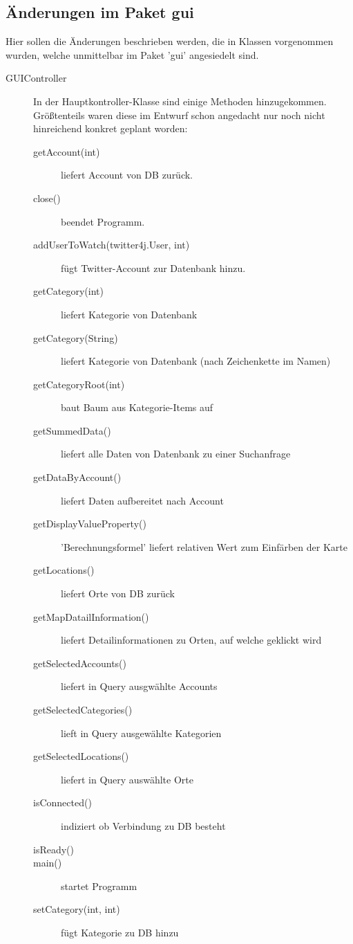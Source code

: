 \subsection{Änderungen im Paket gui}
	Hier sollen die Änderungen beschrieben werden, die in Klassen vorgenommen wurden, welche unmittelbar im Paket 'gui' angesiedelt sind.
	\begin{description}
		\item [GUIController] 
		\quad 
		In der Hauptkontroller-Klasse sind einige Methoden hinzugekommen. Größtenteils waren diese im Entwurf schon angedacht nur noch nicht hinreichend konkret geplant worden:
		\begin{description}
			\item[getAccount(int)] liefert Account von DB zurück.
			\item[close()] beendet Programm.
			\item[addUserToWatch(twitter4j.User, int)] fügt Twitter-Account zur Datenbank hinzu.
			\item[getCategory(int)] liefert Kategorie von Datenbank
			\item[getCategory(String)] liefert Kategorie von Datenbank (nach Zeichenkette im Namen)
			\item[getCategoryRoot(int\text{[]})] baut Baum aus Kategorie-Items auf
			\item[getSummedData()] liefert alle Daten von Datenbank zu einer Suchanfrage
			\item[getDataByAccount()] liefert Daten aufbereitet nach Account
			\item[getDisplayValueProperty()] 'Berechnungsformel' liefert relativen Wert zum Einfärben der Karte
			\item[getLocations()] liefert Orte von DB zurück
			\item[getMapDatailInformation()] liefert Detailinformationen zu Orten, auf welche geklickt wird
			\item[getSelectedAccounts()] liefert in Query ausgwählte Accounts
			\item[getSelectedCategories()] lieft in Query ausgewählte Kategorien
			\item[getSelectedLocations()] liefert in Query auswählte Orte
			\item[isConnected()] indiziert ob Verbindung zu DB besteht
			\item[isReady()]
			\item[main()] startet Programm
			\item[setCategory(int, int)] fügt Kategorie zu DB hinzu

\end{description}
\end{description}
